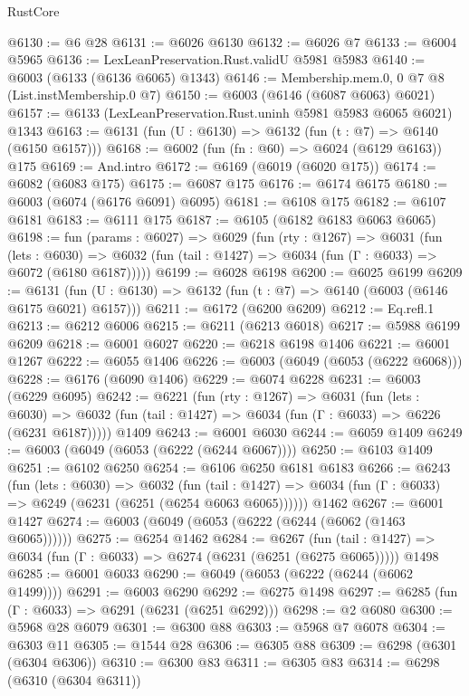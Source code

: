 \begin{lexlean}{RustCore}
\begin{coremodule}
@6130 := @6 @28
@6131 := @6026 @6130
@6132 := @6026 @7
@6133 := @6004 @5965
@6136 := LexLeanPreservation.Rust.validU @5981 @5983
@6140 := @6003 (@6133 (@6136 @6065) @1343)
@6146 := Membership.mem.{0, 0} @7 @8 (List.instMembership.{0} @7)
@6150 := @6003 (@6146 (@6087 @6063) @6021)
@6157 := @6133 (LexLeanPreservation.Rust.uninh @5981 @5983 @6065 @6021) @1343
@6163 := @6131 (fun (U : @6130) => @6132 (fun (t : @7) => @6140 (@6150 @6157)))
@6168 := @6002 (fun (fn : @60) => @6024 (@6129 @6163)) @175
@6169 := And.intro
@6172 := @6169 (@6019 (@6020 @175))
@6174 := @6082 (@6083 @175)
@6175 := @6087 @175
@6176 := @6174 @6175
@6180 := @6003 (@6074 (@6176 @6091) @6095)
@6181 := @6108 @175
@6182 := @6107 @6181
@6183 := @6111 @175
@6187 := @6105 (@6182 @6183 @6063 @6065)
@6198 := fun (params : @6027) =>
  @6029
    (fun (rty : @1267) =>
    @6031
      (fun (lets : @6030) =>
      @6032 (fun (tail : @1427) => @6034 (fun (Γ : @6033) => @6072 (@6180 @6187)))))
@6199 := @6028 @6198
@6200 := @6025 @6199
@6209 := @6131 (fun (U : @6130) => @6132 (fun (t : @7) => @6140 (@6003 (@6146 @6175 @6021) @6157)))
@6211 := @6172 (@6200 @6209)
@6212 := Eq.refl.{1}
@6213 := @6212 @6006
@6215 := @6211 (@6213 @6018)
@6217 := @5988 @6199 @6209
@6218 := @6001 @6027
@6220 := @6218 @6198 @1406
@6221 := @6001 @1267
@6222 := @6055 @1406
@6226 := @6003 (@6049 (@6053 (@6222 @6068)))
@6228 := @6176 (@6090 @1406)
@6229 := @6074 @6228
@6231 := @6003 (@6229 @6095)
@6242 := @6221
    (fun (rty : @1267) =>
    @6031
      (fun (lets : @6030) =>
      @6032 (fun (tail : @1427) => @6034 (fun (Γ : @6033) => @6226 (@6231 @6187)))))
    @1409
@6243 := @6001 @6030
@6244 := @6059 @1409
@6249 := @6003 (@6049 (@6053 (@6222 (@6244 @6067))))
@6250 := @6103 @1409
@6251 := @6102 @6250
@6254 := @6106 @6250 @6181 @6183
@6266 := @6243
    (fun (lets : @6030) =>
    @6032
      (fun (tail : @1427) => @6034 (fun (Γ : @6033) => @6249 (@6231 (@6251 (@6254 @6063 @6065))))))
    @1462
@6267 := @6001 @1427
@6274 := @6003 (@6049 (@6053 (@6222 (@6244 (@6062 (@1463 @6065))))))
@6275 := @6254 @1462
@6284 := @6267
    (fun (tail : @1427) => @6034 (fun (Γ : @6033) => @6274 (@6231 (@6251 (@6275 @6065)))))
    @1498
@6285 := @6001 @6033
@6290 := @6049 (@6053 (@6222 (@6244 (@6062 @1499))))
@6291 := @6003 @6290
@6292 := @6275 @1498
@6297 := @6285 (fun (Γ : @6033) => @6291 (@6231 (@6251 @6292)))
@6298 := @2 @6080
@6300 := @5968 @28 @6079
@6301 := @6300 @88
@6303 := @5968 @7 @6078
@6304 := @6303 @11
@6305 := @1544 @28
@6306 := @6305 @88
@6309 := @6298 (@6301 (@6304 @6306))
@6310 := @6300 @83
@6311 := @6305 @83
@6314 := @6298 (@6310 (@6304 @6311))

\end{coremodule}
\end{lexlean}
